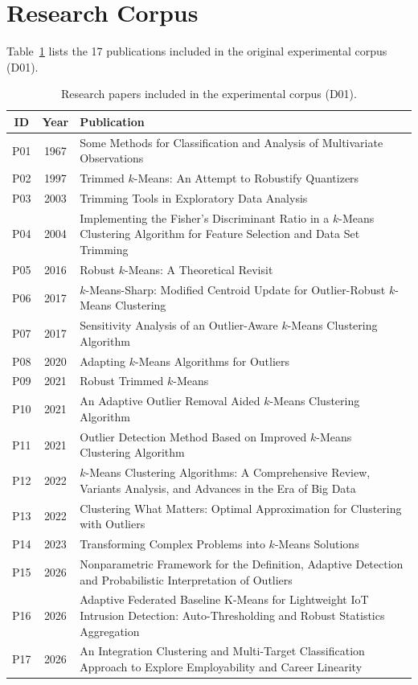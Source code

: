 \documentclass[sigconf,review,anonymous=false]{acmart}
\begin{document}
\appendix
\section{Research Corpus}\label{app:corpus}
Table~\ref{tab:corpus} lists the 17 publications included in the original experimental corpus (D01).
\begin{table}[t]
\caption{Research papers included in the experimental corpus (D01).}
\label{tab:corpus}
\centering\small
\begin{tabularx}{\textwidth}{c c X}
\toprule
ID & Year & Publication \\
\midrule
P01 & 1967 & Some Methods for Classification and Analysis of Multivariate Observations \cite{macqueen1967} \\
P02 & 1997 & Trimmed $k$-Means: An Attempt to Robustify Quantizers \cite{cuesta1997} \\
P03 & 2003 & Trimming Tools in Exploratory Data Analysis \cite{garcia2003} \\
P04 & 2004 & Implementing the Fisher's Discriminant Ratio in a $k$-Means Clustering Algorithm for Feature Selection and Data Set Trimming \cite{lin2004} \\
P05 & 2016 & Robust $k$-Means: A Theoretical Revisit \cite{georgogiannis2016} \\
P06 & 2017 & $k$-Means-Sharp: Modified Centroid Update for Outlier-Robust $k$-Means Clustering \cite{olukanmi2017sharp} \\
P07 & 2017 & Sensitivity Analysis of an Outlier-Aware $k$-Means Clustering Algorithm \cite{olukanmi2017sensitivity} \\
P08 & 2020 & Adapting $k$-Means Algorithms for Outliers \cite{grunau2020} \\
P09 & 2021 & Robust Trimmed $k$-Means \cite{dorabiala2021} \\
P10 & 2021 & An Adaptive Outlier Removal Aided $k$-Means Clustering Algorithm \cite{shrifan2021} \\
P11 & 2021 & Outlier Detection Method Based on Improved $k$-Means Clustering Algorithm \cite{liu2021outlier} \\
P12 & 2022 & $k$-Means Clustering Algorithms: A Comprehensive Review, Variants Analysis, and Advances in the Era of Big Data \cite{ikotun2022} \\
P13 & 2022 & Clustering What Matters: Optimal Approximation for Clustering with Outliers \cite{agrawal2022} \\
P14 & 2023 & Transforming Complex Problems into $k$-Means Solutions \cite{liu2023transforming} \\
P15 & 2026 & Nonparametric Framework for the Definition, Adaptive Detection and Probabilistic Interpretation of Outliers \cite{iannaccio2026} \\
P16 & 2026 & Adaptive Federated Baseline K-Means for Lightweight IoT Intrusion Detection: Auto-Thresholding and Robust Statistics Aggregation \cite{alsaleh2026} \\
P17 & 2026 & An Integration Clustering and Multi-Target Classification Approach to Explore Employability and Career Linearity \cite{ghayatrie2026} \\
\bottomrule
\end{tabularx}
\end{table}
\end{document}
